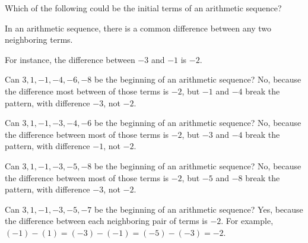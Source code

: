 \documentclass{ximera}
\begin{document}
\begin{question}
  Which of the following could be the initial terms of an arithmetic sequence?

    \begin{hint}
      In an arithmetic sequence, there is a common difference between any two neighboring terms.
    \end{hint}
    \begin{hint}
      For instance, the difference between $-3$ and $-1$ is $-2$.
    \end{hint}
    \begin{hint}
      Can $3,  1,  -1,  -4,  -6,  -8 $ be the beginning of an arithmetic sequence?  No, because the difference most between of those terms is $-2$, but $-1$ and $-4$ break the pattern, with difference $-3$, not $-2$.
    \end{hint}
    \begin{hint}
      Can $3,  1,  -1,  -3,  -4,  -6 $ be the beginning of an arithmetic sequence?  No, because the difference between most of those terms is $-2$, but $-3$ and $-4$ break the pattern, with difference $-1$, not $-2$.
    \end{hint}
    \begin{hint}
      Can $3,  1,  -1,  -3,  -5,  -8 $ be the beginning of an arithmetic sequence?  No, because the difference between most of those terms is $-2$, but $-5$ and $-8$ break the pattern, with difference $-3$, not $-2$.
    \end{hint}
    \begin{hint}
      Can $3,  1,  -1,  -3,  -5,  -7 $ be the beginning of an arithmetic sequence?  Yes, because the difference between each neighboring pair of terms is $-2$.  For example, 
      $\left(-1\right) - \left(1\right) = \left(-3\right) - \left(-1\right) = \left(-5\right) - \left(-3\right) = -2$.
    \end{hint}

    \begin{multipleChoice}
    \end{multipleChoice}

\end{question}
\end{document}
